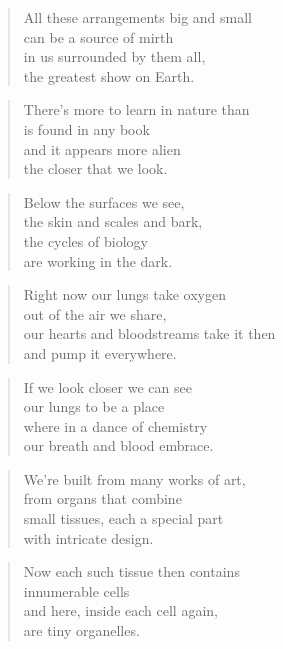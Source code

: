 \documentclass[14pt,a4paper]{article}
\begin{document}
\begin{verse}
All these arrangements big and small\\
can be a source of mirth\\
in us surrounded by them all,\\
the greatest show on Earth.
\end{verse}

\begin{verse}
There’s more to learn in nature than\\
is found in any book\\
and it appears more alien\\
the closer that we look.
\end{verse}

\begin{verse}
Below the surfaces we see,\\
the skin and scales and bark,\\
the cycles of biology\\
are working in the dark.
\end{verse}

\begin{verse}
Right now our lungs take oxygen\\
out of the air we share,\\
our hearts and bloodstreams take it then\\
and pump it everywhere.
\end{verse}

\begin{verse}
If we look closer we can see\\
our lungs to be a place\\
where in a dance of chemistry\\
our breath and blood embrace.
\end{verse}

\begin{verse}
We’re built from many works of art,\\
from organs that combine\\
small tissues, each a special part\\
with intricate design.
\end{verse}

\begin{verse}
Now each such tissue then contains\\
innumerable cells\\
and here, inside each cell again,\\
are tiny organelles.
\end{verse}
\end{document}
